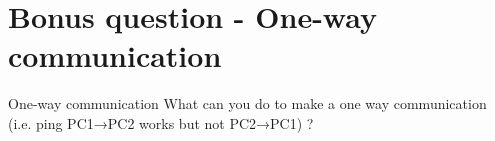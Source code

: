 \section{Bonus question - One-way communication}

\begin{bonusQuestionBox}{One-way communication}
    What can you do to make a one way communication (i.e. ping PC1→PC2 works but not PC2→PC1) ?
\end{bonusQuestionBox}
